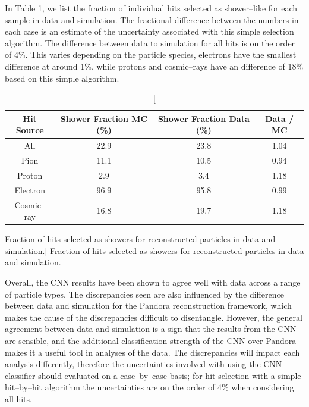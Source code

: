 In Table \ref{tab:frac_selected}, we list the fraction of individual hits 
selected as shower--like for each sample in data and simulation. The 
fractional difference between the numbers in each case is an estimate of the 
uncertainty associated with this simple selection algorithm. The difference 
between data to simulation for all hits is on the order of 4\%. This varies 
depending on the particle species, electrons have the smallest difference at 
around 1\%, while protons and cosmic--rays have an difference of 18\% based on 
this simple algorithm.  
\begin{table}
	\centering
	\bgroup 
	\def\arraystretch{1.5}
	\begin{tabularx}{\textwidth}{@{}c|c|c|c@{}}
		Hit Source  & Shower Fraction MC (\%) & Shower Fraction Data (\%) & Data / MC\\\hline
		All         & 22.9                    & 23.8                      & 1.04 \\
		Pion        & 11.1                    & 10.5                      & 0.94 \\
		Proton      & 2.9                     & 3.4                       & 1.18 \\
		Electron    & 96.9                    & 95.8                      & 0.99 \\
		Cosmic--ray & 16.8                    & 19.7                      & 1.18
	\end{tabularx}
	\egroup
	\caption
	[Fraction of hits selected as showers for reconstructed particles in
	\protodune{} data and simulation.]
	{Fraction of hits selected as showers for reconstructed particles in
	\protodune{} data and simulation.}
	\label{tab:frac_selected}
\end{table}

Overall, the CNN results have been shown to agree well with data across a 
range of particle types. The discrepancies seen are also influenced by the 
difference between data and simulation for the Pandora reconstruction 
framework, which makes the cause of the discrepancies difficult to 
disentangle. However, the general agreement between data and simulation is a 
sign that the results from the CNN are sensible, and the additional 
classification strength of the CNN over Pandora makes it a useful tool in 
analyses of the \protodune{} data. The discrepancies will impact each analysis 
differently, therefore the uncertainties involved with using the CNN 
classifier should evaluated on a case--by--case basis; for hit selection with 
a simple hit--by--hit algorithm the uncertainties are on the order of 4\% when
considering all hits.

